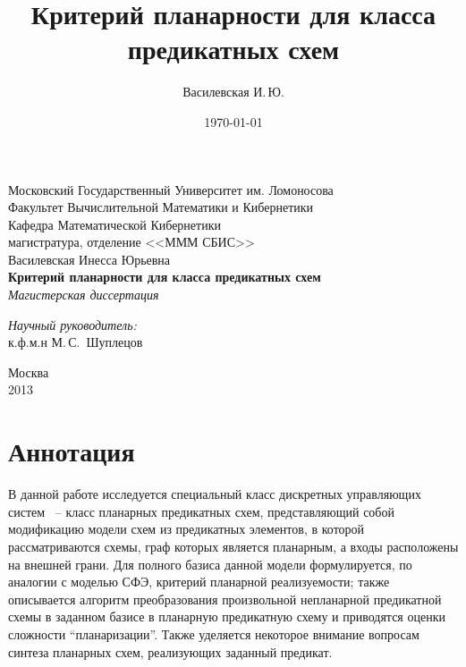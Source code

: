 \documentclass[12pt]{article}
\title{Критерий планарности для класса предикатных схем}
\author{Василевская И.\,Ю.}
\date{\today}
\begin{document}
    \begin{titlepage}
        \begin{center}
            Московский Государственный Университет им. Ломоносова\\
            Факультет Вычислительной Математики и Кибернетики\\
            Кафедра Математической Кибернетики\\
            магистратура, отделение <<МММ СБИС>>\\[6cm]

            \large {Василевская Инесса Юрьевна}\\
            \LARGE \textbf {Критерий планарности для класса предикатных схем}\\[0.8cm]
            \large \emph {Магистерская диссертация}\\[5.0cm]

            \begin{flushright}
                \large
                \begin{minipage}{0.40\textwidth}
                    \begin{flushleft}
                        \emph{Научный руководитель:}\\к.ф.м.н М.\,С.~Шуплецов
                    \end{flushleft}
                \end{minipage}
            \end{flushright}

            \vfill
            Москва\\
			2013
        \end{center}
    \end{titlepage}

\setcounter{page}{2}

\section{Аннотация}
\label{anno}
В данной работе исследуется специальный класс дискретных управляющих систем ~-- класс планарных предикатных схем, 
представляющий собой модификацию модели схем из предикатных элементов, в которой рассматриваются схемы,
граф которых является планарным, а входы расположены на внешней грани.
Для полного базиса данной модели формулируется, по аналогии с моделью СФЭ, критерий планарной
реализуемости; также описывается алгоритм преобразования произвольной непланарной предикатной схемы 
в заданном базисе в планарную предикатную схему и приводятся оценки сложности ``планаризации''.
Также уделяется некоторое внимание вопросам синтеза планарных схем, реализующих заданный предикат.
\clearpage
\end{document}
